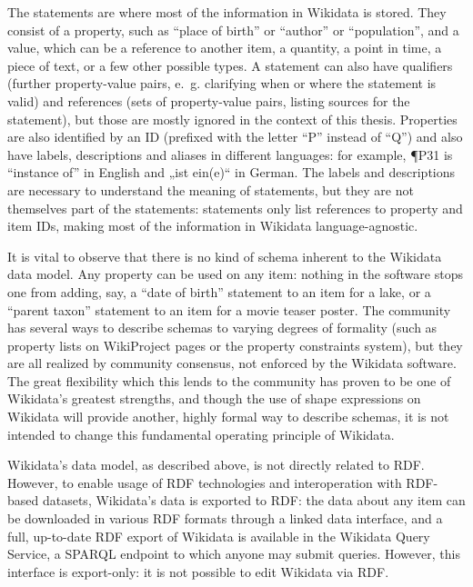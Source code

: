 The statements are where most of the information in Wikidata is stored.
They consist of a property, such as “place of birth” or “author” or “population”,
and a value, which can be a reference to another item, a quantity, a point in time, a piece of text,
or a few other possible types.
A statement can also have qualifiers
(further property-value pairs, e.~g. clarifying when or where the statement is valid)
and references (sets of property-value pairs, listing sources for the statement),
but those are mostly ignored in the context of this thesis.
Properties are also identified by an ID
(prefixed with the letter “P” instead of “Q”)
and also have labels, descriptions and aliases in different languages:
for example, \P{P31} is “instance of” in English and „\foreignlanguage{ngerman}{ist ein(e)}“ in German.
The labels and descriptions are necessary to understand the meaning of statements,
but they are not themselves part of the statements:
statements only list references to property and item IDs,
making most of the information in Wikidata language-agnostic.

It is vital to observe that there is no kind of schema inherent to the Wikidata data model.
Any property can be used on any item:
nothing in the software stops one from adding, say,
a “date of birth” statement to an item for a lake,
or a “parent taxon” statement to an item for a movie teaser poster.
The community has several ways to describe schemas to varying degrees of formality
(such as property lists on WikiProject pages or the property constraints system),
but they are all realized by community consensus,
not enforced by the Wikidata software.
The great flexibility which this lends to the community has proven to be one of Wikidata’s greatest strengths, %
and though the use of shape expressions %
on Wikidata will provide another,
highly formal way to describe schemas,
it is not intended to change this fundamental operating principle of Wikidata. %

Wikidata’s data model, as described above,
is not directly related to RDF. %
However, to enable usage of RDF technologies and interoperation with RDF-based datasets,
Wikidata’s data is exported to RDF:
the data about any item can be downloaded in various RDF formats through a linked data interface, %
and a full, up-to-date RDF export of Wikidata is available in the Wikidata Query Service,
a SPARQL endpoint to which anyone may submit queries.
However, this interface is export-only:
it is not possible to edit Wikidata via RDF.

